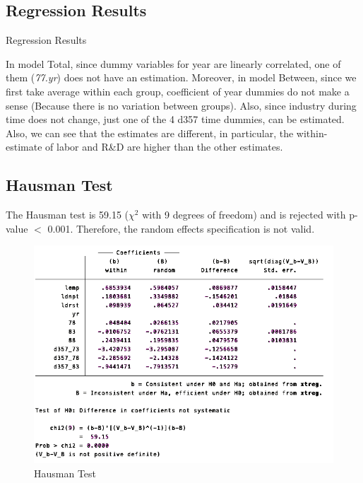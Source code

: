 
\subsection{Regression Results}
\begin{table}[h]
    \centering
    \small
    
    \caption{Regression Results}
    \label{tab:my_label}
\end{table}

In model Total, since dummy variables for year are linearly correlated, one of them (\textit{77.yr}) does not have an estimation. Moreover, in model Between, since we first take average within each group, coefficient of year dummies do not make a sense (Because there is no variation between groups). Also, since industry during time does not change, just one of the 4 d357 time dummies, can be estimated. 
Also, we can see that the estimates are different, in particular, the within-estimate of labor and R&D are higher than the other estimates. 

\subsection{Hausman Test}

The Hausman test is 59.15 ($\chi^2$ with 9 degrees of freedom) and is rejected with p-value $<$ 0.001. Therefore, the random effects specification is not valid.

\begin{figure}[h]
    \centering
    \includegraphics[scale=0.5]{HW1/LATEX/Attachments/Q2_2.png}
    \caption{Hausman Test}
    \label{fig:my_label}
\end{figure}

